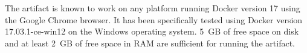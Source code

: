 \documentclass[a4paper,UKenglish]{darts}
\begin{document}
\begin{platforms}
  The artifact is known to work on any platform running Docker version 17 using the Google Chrome
  browser. It has been 
  specifically tested using Docker version 17.03.1-ce-win12 on the Windows operating system.
  5~GB of free space on disk and at least 2~GB of free space in RAM are sufficient for running
  the artifact.
\end{platforms}











%

\end{document}
